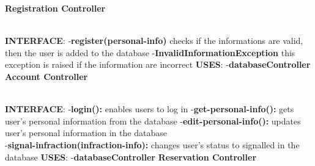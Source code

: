 \documentclass{article}
\begin{document}
\textbf{Registration Controller}\\
\begin{figure}[ht]
\end{figure}\\
\textbf{INTERFACE}: 
 \newline
-\textbf{register(personal-info)} checks if the informations are valid, then the user is added to the database  
\newline
-\textbf{InvalidInformationException} this exception is raised if the 	information are incorrect  
\newline
\textbf{USES}:   
\newline
-\textbf{databaseController}
\newpage
\textbf{Account Controller}\\
\begin{figure}[ht]
\end{figure}\\
\textbf{INTERFACE}: 
 \newline
-\textbf{login():} enables users to log in   
\newline
-\textbf{get-personal-info():} gets user's personal information from the database 
\newline
-\textbf{edit-personal-info():} updates user's personal information in the database \\
-\textbf{signal-infraction(infraction-info):} changes user's status to signalled in the database  
\newline
\textbf{USES}:   
\newline
-\textbf{databaseController}
\newpage
\textbf{Reservation Controller}\\
\begin{figure}[ht]
\end{figure}\\
\end{document}
